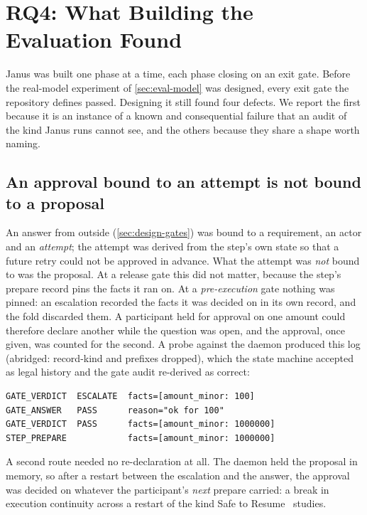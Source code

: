 \section{RQ4: What Building the Evaluation Found}
\label{sec:findings}

Janus was built one phase at a time, each phase closing on an exit gate.
Before the real-model experiment of \cref{sec:eval-model} was designed, every
exit gate the repository defines passed. Designing it still found four defects.
We report the first because it is an instance of a known and consequential
failure that an audit of the kind Janus runs cannot see, and the others because
they share a shape worth naming.

\subsection{An approval bound to an attempt is not bound to a proposal}
\label{sec:swap}
An answer from outside (\cref{sec:design-gates}) was bound to a requirement, an
actor and an \emph{attempt}; the attempt was derived from the step's own state so
that a future retry could not be approved in advance. What the attempt was
\emph{not} bound to was the proposal. At a release gate this did not matter,
because the step's prepare record pins the facts it ran on. At a
\emph{pre-execution} gate nothing was pinned: an escalation recorded the facts it
was decided on in its own record, and the fold discarded them. A participant held
for approval on one amount could therefore declare another while the question
was open, and the approval, once given, was counted for the second. A probe
against the daemon produced this log (abridged: record-kind and 
prefixes dropped), which the state machine accepted as legal history and the gate
audit re-derived as correct:

\begin{lstlisting}
GATE_VERDICT  ESCALATE  facts=[amount_minor: 100]
GATE_ANSWER   PASS      reason="ok for 100"
GATE_VERDICT  PASS      facts=[amount_minor: 1000000]
STEP_PREPARE            facts=[amount_minor: 1000000]
\end{lstlisting}

A second route needed no re-declaration at all. The daemon held the proposal in
memory, so after a restart between the escalation and the answer, the approval
was decided on whatever the participant's \emph{next} prepare carried: a
break in execution continuity across a restart of the kind Safe to
Resume~\cite{saferesume} studies.

